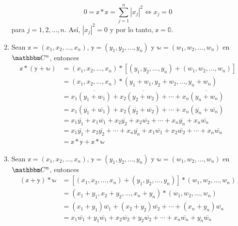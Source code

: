 \begin{example}
\begin{enumerate}[label=\roman*)]
        $$0 = \mathbb{x} * \mathbb{x} = \sum_{j=1}^{n} |x_j|^2 \Longleftrightarrow x_j = 0$$
        para $j = 1, 2, \dots, n$. Así, $|x_j|^2 = 0$ y por lo tanto, $\mathbb{x} = \mathbb{0}$.\newpage
        \item Sean $\mathbb{x} = (x_1, x_2, \dots, x_n)$, $\mathbb{y} = (y_1, y_2, \dots, y_n)$ y $\mathbb{w} = (w_1, w_2, \dots, w_n)$ en $\CC[n]$, entonces
        \begin{align*}
            \mathbb{x} * (\mathbb{y} + \mathbb{w}) & = (x_1, x_2, \dots, x_n) * \left[ (y_1, y_2, \dots, y_n) + (w_1, w_2, \dots, w_n) \right] \\
            & = (x_1, x_2, \dots, x_n) * (y_1 + w_1, y_2 + w_2, \dots, y_n + w_n) \\
            & = x_1 \overline{\left(y_1 + w_1\right)} + x_2 \overline{\left(y_2 + w_2\right)} + \cdots + x_n \overline{\left(y_n + w_n\right)} \\
            & = x_1 \left( \overline{y_1} + \overline{w_1} \right) + x_2 \left( \overline{y_2} + \overline{w_2} \right) + \cdots + x_n \left( \overline{y_n} + \overline{w_n} \right) \\
            & = x_1\overline{y_1} + x_1\overline{w_1} + x_2\overline{y_2} + x_2\overline{w_2} + \cdots + x_n\overline{y_n} + x_n\overline{w_n} \\
            & = x_1\overline{y_1} + x_2\overline{y_2} + \cdots + x_n\overline{y_n} + x_1\overline{w_1} + x_2\overline{w_2} + \cdots + x_n\overline{w_n} \\
            & = \mathbb{x} * \mathbb{y} + \mathbb{x} * \mathbb{w}
        \end{align*}
        \item Sean $\mathbb{x} = (x_1, x_2, \dots, x_n)$, $\mathbb{y} = (y_1, y_2, \dots, y_n)$ y $\mathbb{w} = (w_1, w_2, \dots, w_n)$ en $\CC[n]$, entonces
        \begin{align*}
            (\mathbb{x} + \mathbb{y}) * \mathbb{w} & = \left[ (x_1, x_2, \dots, x_n) + (y_1, y_2, \dots, y_n) \right] * (w_1, w_2, \dots, w_n) \\
            & = (x_1 + y_1, x_2 + y_2, \dots, x_n + y_n) * (w_1, w_2, \dots, w_n) \\
            & = (x_1 + y_1) \overline{w_1} + (x_2 + y_2) \overline{w_2} + \cdots + (x_n + y_n) \overline{w_n} \\
            & = x_1\overline{w_1} + y_1\overline{w_1} + x_2\overline{w_2} + y_2\overline{w_2} + \cdots + x_n\overline{w_n} + y_n\overline{w_n} \\

\end{align*}
\end{enumerate}
\end{example}
